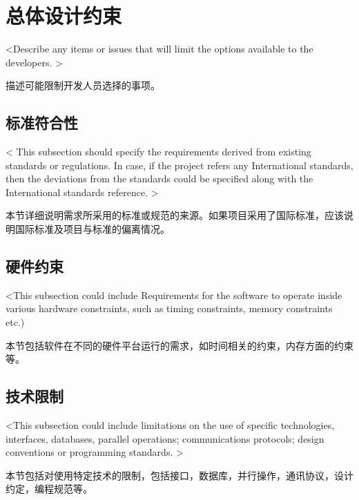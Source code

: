 \chapter{总体设计约束}
<Describe any items or issues that will limit the options available to the developers. >

描述可能限制开发人员选择的事项。
 
\section{标准符合性}
< This subsection should specify the requirements derived from existing standards or regulations. In case, if the project refers any International standards, then the deviations from the standards could be specified along with the International standards reference. >

本节详细说明需求所采用的标准或规范的来源。如果项目采用了国际标准，应该说明国际标准及项目与标准的偏离情况。

\section{硬件约束}
<This subsection could include Requirements for the software to operate inside various hardware constraints, such as timing constraints, memory constraints etc.)

本节包括软件在不同的硬件平台运行的需求，如时间相关的约束，内存方面的约束等。

\section{技术限制}
<This subsection could include limitations on the use of specific technologies, interfaces, databases, parallel operations; communications protocols; design conventions or programming standards. >

本节包括对使用特定技术的限制，包括接口，数据库，并行操作，通讯协议，设计约定，编程规范等。

